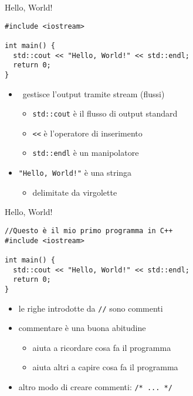 \begin{frame}[fragile]{Hello, World!}
  \vfill
  \begin{lstlisting}
#include <iostream>

int main() {
  std::cout << "Hello, World!" << std::endl;
  return 0;
}
  \end{lstlisting}
  \vfill
  \begin{itemize}
    \item \CC\ gestisce l'output tramite \alert{stream} (flussi)
    \begin{itemize}
      \item \lstinline$std::cout$ è il flusso di output standard
      \item \lstinline$<<$ è l'operatore di \alert{inserimento}
      \item \lstinline$std::endl$ è un \alert{manipolatore}
    \end{itemize}
    \vfill
    \item \lstinline$"Hello, World!"$ è una \alert{stringa}
    \begin{itemize}
      \item delimitate da \alert{virgolette}
    \end{itemize}
  \end{itemize}
  \vfill
\end{frame}

\begin{frame}[fragile]{Hello, World!}
  \vfill
  \begin{lstlisting}
//Questo è il mio primo programma in C++
#include <iostream>

int main() {
  std::cout << "Hello, World!" << std::endl;
  return 0;
}
  \end{lstlisting}
  \vfill
  \begin{itemize}
    \item le righe introdotte da \lstinline$//$ sono \alert{commenti}
    \vfill
    \item commentare è una buona abitudine
    \begin{itemize}
      \item aiuta a ricordare cosa fa il programma
      \item aiuta altri a capire cosa fa il programma
    \end{itemize}
    \vfill
    \item altro modo di creare commenti: \lstinline$/* ... */$
  \end{itemize}
  \vfill
\end{frame}

